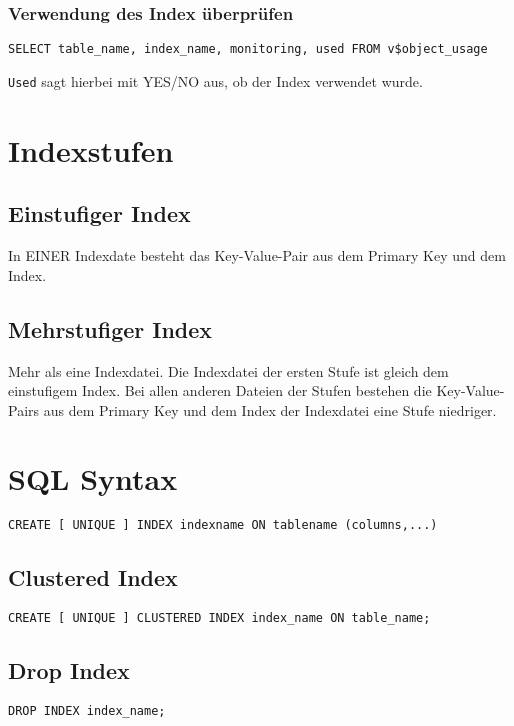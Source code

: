 \subsubsection{Verwendung des Index überprüfen}

\begin{lstlisting}
SELECT table_name, index_name, monitoring, used FROM v$object_usage
\end{lstlisting}

\lstinline{Used} sagt hierbei mit YES/NO aus, ob der Index verwendet wurde.

\section{Indexstufen}

\subsection{Einstufiger Index}

In EINER Indexdate besteht das Key-Value-Pair aus dem Primary Key und dem Index.

\subsection{Mehrstufiger Index}

Mehr als eine Indexdatei. Die Indexdatei der ersten Stufe ist gleich dem einstufigem Index. Bei allen anderen Dateien der Stufen bestehen die Key-Value-Pairs aus dem Primary Key und dem Index der Indexdatei eine Stufe niedriger.

\section{SQL Syntax}

\begin{lstlisting}
CREATE [ UNIQUE ] INDEX indexname ON tablename (columns,...)
\end{lstlisting}

\subsection{Clustered Index}

\begin{lstlisting}
CREATE [ UNIQUE ] CLUSTERED INDEX index_name ON table_name;
\end{lstlisting}

\subsection{Drop Index}

\begin{lstlisting}
DROP INDEX index_name;  
\end{lstlisting}